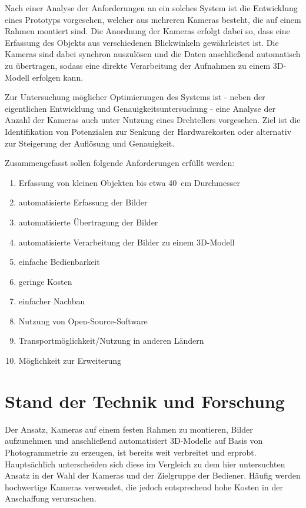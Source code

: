 \documentclass[./00PhotoBox]{subfiles}
\begin{document}
Nach einer Analyse der Anforderungen an ein solches System ist die Entwicklung eines Prototyps vorgesehen, welcher aus mehreren Kameras besteht, die auf einem Rahmen montiert sind. Die Anordnung der Kameras erfolgt dabei so, dass eine Erfassung des Objekts aus verschiedenen Blickwinkeln gewährleistet ist. Die Kameras sind dabei synchron auszulösen und die Daten anschließend au\-to\-ma\-tisch zu übertragen, sodass eine direkte Verarbeitung der Aufnahmen zu einem 3D-Modell erfolgen kann.

Zur Untersuchung möglicher Optimierungen des Systems ist - neben der eigentlichen Entwicklung und Genauigkeitsuntersuchung - eine Analyse der Anzahl der Kameras auch unter Nutzung eines Drehtellers vorgesehen. Ziel ist die Identifikation von Potenzialen zur Senkung der Hardwarekosten oder alternativ zur Steigerung der Auflösung und Genauigkeit.

Zusammengefasst sollen folgende Anforderungen erfüllt werden:

\begin{enumerate}
    \item Erfassung von kleinen Objekten bis etwa \SI{40}{\centi\metre} Durchmesser
    \item automatisierte Erfassung der Bilder
    \item automatisierte Übertragung der Bilder
    \item automatisierte Verarbeitung der Bilder zu einem 3D-Modell
    \item einfache Bedienbarkeit
    \item geringe Kosten
    \item einfacher Nachbau
    \item Nutzung von Open-Source-Software
    \item Transportmöglichkeit/Nutzung in anderen Ländern
    \item Möglichkeit zur Erweiterung
\end{enumerate}

\section{Stand der Technik und Forschung}
Der Ansatz, Kameras auf einem festen Rahmen zu montieren, Bilder aufzunehmen und anschließend automatisiert 3D-Modelle auf Basis von Photogrammetrie zu erzeugen, ist bereits weit verbreitet und erprobt. Hauptsächlich unterscheiden sich diese im Vergleich zu dem hier untersuchten Ansatz in der Wahl der Kameras und der Zielgruppe der Bediener. Häufig werden hochwertige Kameras verwendet, die jedoch entsprechend hohe Kosten in der Anschaffung verursachen.
\end{document}
